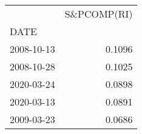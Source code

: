 \begin{tabular}{lr}
\toprule
{} &  S\&PCOMP(RI) \\
DATE       &              \\
\midrule
2008-10-13 &       0.1096 \\
2008-10-28 &       0.1025 \\
2020-03-24 &       0.0898 \\
2020-03-13 &       0.0891 \\
2009-03-23 &       0.0686 \\
\bottomrule
\end{tabular}
